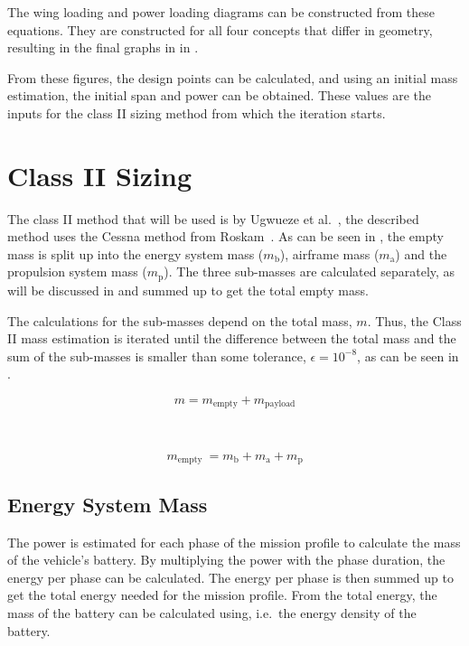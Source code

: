 The wing loading and power loading diagrams can be constructed from these equations.
They are constructed for all four concepts that differ in geometry, resulting in the final graphs in  in .


From these figures, the design points can be calculated, and using an initial mass estimation, the initial span and power can be obtained.
These values are the inputs for the class II sizing method from which the iteration starts.


\section{Class II Sizing}
\label{sec:Class_II_sizing}
The class II method that will be used is by Ugwueze et al.~\cite{Ugwueze_Sizing_Method}, the described method uses the Cessna method from Roskam~\cite{Roskam_Part_V}.
As can be seen in , the empty mass is split up into the energy system mass ($m_\text{b}$), airframe mass ($m_\text{a}$) and the propulsion system mass ($m_\text{p}$).
The three sub-masses are calculated separately, as will be discussed in  and summed up to get the total empty mass.

The calculations for the sub-masses depend on the total mass, $m$.
Thus, the Class II mass estimation is iterated until the difference between the total mass and the sum of the sub-masses is smaller than some tolerance, $\epsilon=10^{-8}$, as can be seen in .


\begin{minipage}{.45\linewidth}
    \begin{equation}
    \label{eq:m_total_classII}
    m = m_{\text{empty}} + m_{\text{payload}}
\end{equation}
\end{minipage}
~
\begin{minipage}{.45\linewidth}
    \begin{equation}
    \label{eq:m_empty_classII}
    m_{\text {empty }}=m_\text{b}+m_\text{a}+m_\text{p} 
\end{equation}
\end{minipage}




\subsection{Energy System Mass}\label{subsec:Class_II_sizing_Energy_System_Mass}
The power is estimated for each phase of the mission profile to calculate the mass of the vehicle's battery.
By multiplying the power with the phase duration, the energy per phase can be calculated.
The energy per phase is then summed up to get the total energy needed for the mission profile.
From the total energy, the mass of the battery can be calculated using, i.e.\ the energy density of the battery.

